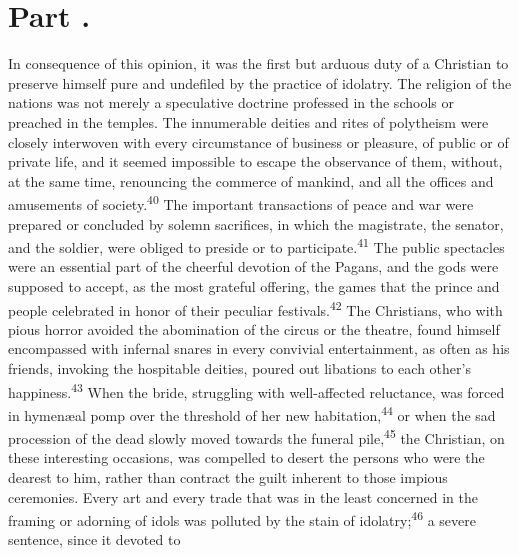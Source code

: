 

\section{Part \thesection.}

In consequence of this opinion, it was the first but arduous duty
of a Christian to preserve himself pure and undefiled by the
practice of idolatry. The religion of the nations was not merely
a speculative doctrine professed in the schools or preached in
the temples. The innumerable deities and rites of polytheism were
closely interwoven with every circumstance of business or
pleasure, of public or of private life, and it seemed impossible
to escape the observance of them, without, at the same time,
renouncing the commerce of mankind, and all the offices and
amusements of society.\textsuperscript{40} The important transactions of peace and
war were prepared or concluded by solemn sacrifices, in which the
magistrate, the senator, and the soldier, were obliged to preside
or to participate.\textsuperscript{41} The public spectacles were an essential
part of the cheerful devotion of the Pagans, and the gods were
supposed to accept, as the most grateful offering, the games that
the prince and people celebrated in honor of their peculiar
festivals.\textsuperscript{42} The Christians, who with pious horror avoided the
abomination of the circus or the theatre, found himself
encompassed with infernal snares in every convivial
entertainment, as often as his friends, invoking the hospitable
deities, poured out libations to each other’s happiness.\textsuperscript{43} When
the bride, struggling with well-affected reluctance, was forced
in hymenæal pomp over the threshold of her new habitation,\textsuperscript{44} or
when the sad procession of the dead slowly moved towards the
funeral pile,\textsuperscript{45} the Christian, on these interesting occasions,
was compelled to desert the persons who were the dearest to him,
rather than contract the guilt inherent to those impious
ceremonies. Every art and every trade that was in the least
concerned in the framing or adorning of idols was polluted by the
stain of idolatry;\textsuperscript{46} a severe sentence, since it devoted to
